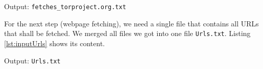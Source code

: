 \begin{listing}[h!]
\caption{Output: \texttt{fetches\_torproject.org.txt}}

\label{lst:torprojectURLs}
\end{listing}

For the next step (webpage fetching), we need a single file that contains all \ac{URL}s that shall be fetched. We merged all files we got into one file \texttt{Urls.txt}. Listing \ref{lst:inputUrls} shows its content.
\begin{listing}[h!]
\caption{Output: \texttt{Urls.txt}}

\label{lst:inputUrls}
\end{listing}
